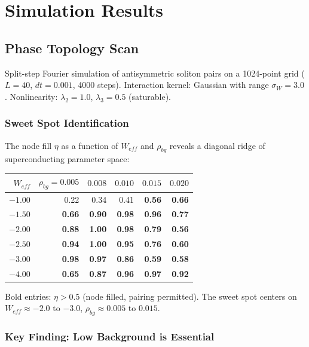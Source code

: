 \documentclass[11pt, a4paper]{article}
\begin{document}
\section{Simulation Results}

\subsection{Phase Topology Scan}

Split-step Fourier simulation of antisymmetric soliton pairs on a
1024-point grid ($L = 40$, $dt = 0.001$, 4000 steps). Interaction
kernel: Gaussian with range $\sigma_W = 3.0$. Nonlinearity:
$\lambda_2 = 1.0$, $\lambda_3 = 0.5$ (saturable).

\subsubsection{Sweet Spot Identification}

The node fill $\eta$ as a function of $W_{eff}$ and $\rho_{bg}$
reveals a diagonal ridge of superconducting parameter space:

\begin{center}
\begin{tabular}{@{}rrrrrr@{}}
\toprule
$W_{eff}$ & $\rho_{bg}=0.005$ & $0.008$ & $0.010$ & $0.015$ & $0.020$ \\
\midrule
$-1.00$ & 0.22 & 0.34 & 0.41 & \textbf{0.56} & \textbf{0.66} \\
$-1.50$ & \textbf{0.66} & \textbf{0.90} & \textbf{0.98} & \textbf{0.96} & \textbf{0.77} \\
$-2.00$ & \textbf{0.88} & \textbf{1.00} & \textbf{0.98} & \textbf{0.79} & \textbf{0.56} \\
$-2.50$ & \textbf{0.94} & \textbf{1.00} & \textbf{0.95} & \textbf{0.76} & \textbf{0.60} \\
$-3.00$ & \textbf{0.98} & \textbf{0.97} & \textbf{0.86} & \textbf{0.59} & \textbf{0.58} \\
$-4.00$ & \textbf{0.65} & \textbf{0.87} & \textbf{0.96} & \textbf{0.97} & \textbf{0.92} \\
\bottomrule
\end{tabular}
\end{center}

Bold entries: $\eta > 0.5$ (node filled, pairing permitted).
The sweet spot centers on $W_{eff} \approx -2.0$ to $-3.0$,
$\rho_{bg} \approx 0.005$ to $0.015$.

\subsubsection{Key Finding: Low Background is Essential}
\end{document}
